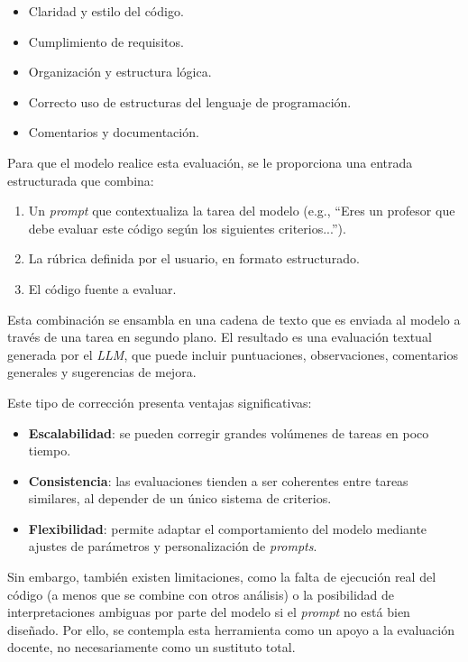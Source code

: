 \begin{itemize}
    \item Claridad y estilo del código.
    \item Cumplimiento de requisitos.
    \item Organización y estructura lógica.
    \item Correcto uso de estructuras del lenguaje de programación.
    \item Comentarios y documentación.
\end{itemize}

Para que el modelo realice esta evaluación, se le proporciona una entrada estructurada que combina:

\begin{enumerate}
    \item Un \textit{prompt} que contextualiza la tarea del modelo (e.g., ``Eres un profesor que debe evaluar este código según los siguientes criterios...'').
    \item La rúbrica definida por el usuario, en formato estructurado.
    \item El código fuente a evaluar.
\end{enumerate}

Esta combinación se ensambla en una cadena de texto que es enviada al modelo a través de una tarea en segundo plano. El resultado es una evaluación 
textual generada por el \textit{LLM}, que puede incluir puntuaciones, observaciones, comentarios generales y sugerencias de mejora.


Este tipo de corrección presenta ventajas significativas:

\begin{itemize}
    \item \textbf{Escalabilidad}: se pueden corregir grandes volúmenes de tareas en poco tiempo.
    \item \textbf{Consistencia}: las evaluaciones tienden a ser coherentes entre tareas similares, al depender de un único sistema de criterios.
    \item \textbf{Flexibilidad}: permite adaptar el comportamiento del modelo mediante ajustes de parámetros y personalización de \textit{prompts}.
\end{itemize}

Sin embargo, también existen limitaciones, como la falta de ejecución real del código (a menos que se combine con otros análisis) o la posibilidad de interpretaciones ambiguas por parte del modelo si el \textit{prompt} no está bien diseñado. Por ello, se contempla esta herramienta como un apoyo a la evaluación docente, no necesariamente como un sustituto total.
